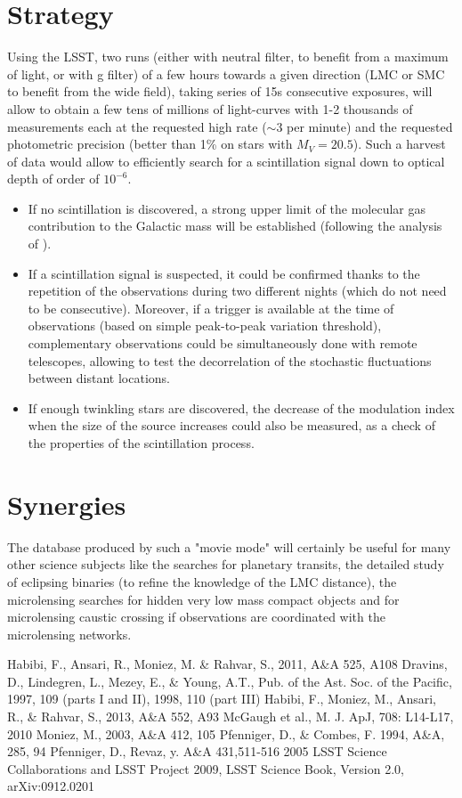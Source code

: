 \documentclass[11pt]{article}
\begin{document}
\section{Strategy}
Using the LSST,
two runs (either with neutral filter, to benefit from a maximum of light, or
with g filter) of a few hours towards a given
direction (LMC or SMC to benefit from the wide field),
taking series of 15s consecutive exposures, will allow
to obtain a few tens of millions of light-curves with 1-2 thousands of measurements each
at the requested high rate ($\sim 3$ per minute) and the requested photometric
precision (better than 1\% on stars with $M_V=20.5$).
Such a harvest of data would allow to efficiently search for a scintillation signal down to
optical depth of order of $10^{-6}$.
\begin{itemize}
\item
If no scintillation is discovered, a strong upper limit of the molecular gas contribution
to the Galactic mass will be established (following the analysis of \cite{habibietal}).
\item
If a scintillation signal is suspected, it could be confirmed thanks to the repetition of the observations
during two different nights (which do not need to be consecutive).
Moreover, if a trigger is available at the time of observations (based on simple peak-to-peak variation
threshold), complementary observations could be simultaneously done with remote
telescopes, allowing to test the decorrelation of the stochastic fluctuations between
distant locations.
\item
If enough twinkling stars are discovered,
the decrease of the modulation index when the size of the source
increases could also be measured, as a check of the properties
of the scintillation process.
\end{itemize}

\section{Synergies}
The database produced by such a "movie mode" will certainly be useful for many other
science subjects like the searches for planetary transits, the detailed study of eclipsing
binaries (to refine the knowledge of the LMC distance), the microlensing
searches for hidden very low mass compact objects and for microlensing caustic crossing if
observations are coordinated with the microlensing networks.

\begin{thebibliography}{99}
Habibi, F., Ansari, R., Moniez, M. \& Rahvar, S., 2011, A\&A 525,
A108
Dravins, D., Lindegren, L., Mezey, E., \& Young, A.T.,
Pub. of the Ast. Soc. of the Pacific, 1997,
109 (parts I and II), 1998, 110 (part III)
Habibi, F., Moniez, M., Ansari, R., \& Rahvar, S., 2013, A\&A 552, A93
McGaugh et al., M. J. ApJ, 708: L14-L17, 2010
Moniez, M., 2003, A\&A 412, 105
Pfenniger, D., \& Combes, F. 1994, A\&A, 285, 94
Pfenniger, D., Revaz, y. A\&A 431,511-516 2005
LSST Science Collaborations and LSST Project 2009, LSST Science Book,
Version 2.0, arXiv:0912.0201
\end{thebibliography}
\end{document}
